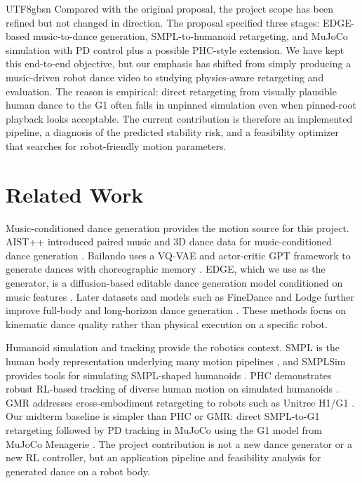\documentclass[conference]{IEEEtran}
\begin{document}
\begin{CJK*}{UTF8}{gbsn}
Compared with the original proposal, the project scope has been refined but not changed in direction. The proposal specified three stages: EDGE-based music-to-dance generation, SMPL-to-humanoid retargeting, and MuJoCo simulation with PD control plus a possible PHC-style extension. We have kept this end-to-end objective, but our emphasis has shifted from simply producing a music-driven robot dance video to studying physics-aware retargeting and evaluation. The reason is empirical: direct retargeting from visually plausible human dance to the G1 often falls in unpinned simulation even when pinned-root playback looks acceptable. The current contribution is therefore an implemented pipeline, a diagnosis of the predicted stability risk, and a feasibility optimizer that searches for robot-friendly motion parameters.

\section{Related Work}
Music-conditioned dance generation provides the motion source for this project. AIST++ introduced paired music and 3D dance data for music-conditioned dance generation \cite{li2021aistpp}. Bailando uses a VQ-VAE and actor-critic GPT framework to generate dances with choreographic memory \cite{siyao2022bailando}. EDGE, which we use as the generator, is a diffusion-based editable dance generation model conditioned on music features \cite{tseng2023edge}. Later datasets and models such as FineDance and Lodge further improve full-body and long-horizon dance generation \cite{li2023finedance,li2024lodge}. These methods focus on kinematic dance quality rather than physical execution on a specific robot.

Humanoid simulation and tracking provide the robotics context. SMPL is the human body representation underlying many motion pipelines \cite{loper2015smpl}, and SMPLSim provides tools for simulating SMPL-shaped humanoids \cite{luo2024smplsim}. PHC demonstrates robust RL-based tracking of diverse human motion on simulated humanoids \cite{luo2023phc}. GMR addresses cross-embodiment retargeting to robots such as Unitree H1/G1 \cite{araujo2026gmr}. Our midterm baseline is simpler than PHC or GMR: direct SMPL-to-G1 retargeting followed by PD tracking in MuJoCo \cite{todorov2012mujoco} using the G1 model from MuJoCo Menagerie \cite{mujocomenagerie}. The project contribution is not a new dance generator or a new RL controller, but an application pipeline and feasibility analysis for generated dance on a robot body.


\end{CJK*}
\end{document}

